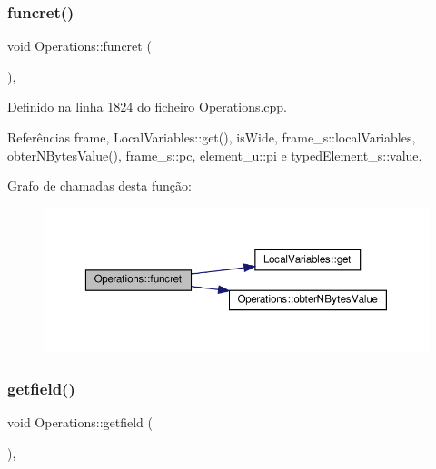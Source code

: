 \subsubsection{\texorpdfstring{funcret()}{funcret()}}
{\footnotesize\ttfamily void Operations\+::funcret (\begin{DoxyParamCaption}{ }\end{DoxyParamCaption})\hspace{0.3cm}{\ttfamily [static]}, {\ttfamily [private]}}



Definido na linha 1824 do ficheiro Operations.\+cpp.



Referências frame, Local\+Variables\+::get(), is\+Wide, frame\+\_\+s\+::local\+Variables, obter\+N\+Bytes\+Value(), frame\+\_\+s\+::pc, element\+\_\+u\+::pi e typed\+Element\+\_\+s\+::value.

Grafo de chamadas desta função\+:
\nopagebreak
\begin{figure}[H]
\begin{center}
\leavevmode
\includegraphics[width=350pt]{classOperations_a1880a30623072f8388be782dcf1a390e_cgraph}
\end{center}
\end{figure}
\mbox{\label{classOperations_a0bb399fe0f64dc21699132c092560e19}} 
\subsubsection{\texorpdfstring{getfield()}{getfield()}}
{\footnotesize\ttfamily void Operations\+::getfield (\begin{DoxyParamCaption}{ }\end{DoxyParamCaption})\hspace{0.3cm}{\ttfamily [static]}, {\ttfamily [private]}}



